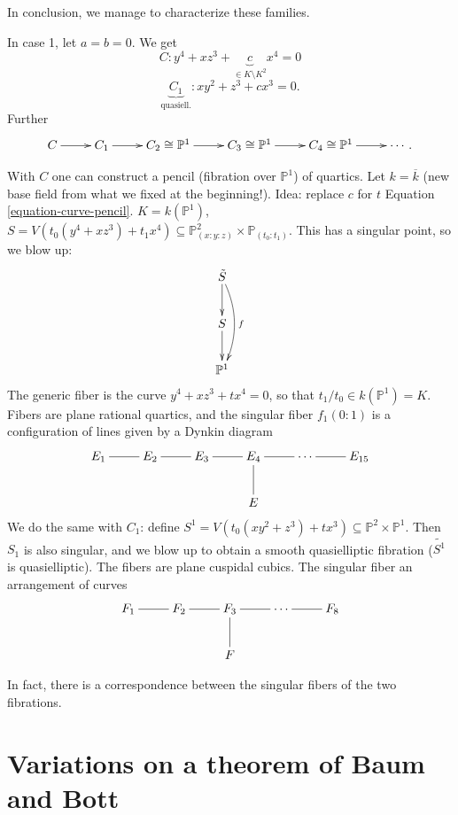 \noindent
In conclusion, we manage to characterize
these families.

\begin{example}
\label{example-chain-of-maps}
In case 1, let $a=b=0$. We get
\begin{equation}
\label{equation-curve-pencil}
C: y^4+xz^3+\underbrace{c}_{\in K\setminus
K^2}x^4=0
\end{equation}
$$
\underbrace{C_1}_{\text{quasiell.}}:xy^2+z^3+
cx^3=0.
$$
Further
$$
\xymatrix{
C\ar[r]&C_1\ar[r]&C_2 \cong\mathbb{P}^1\ar[r]
&C_3 \cong \mathbb{P}^1\ar[r]&C_4\cong
\mathbb{P}^1\ar[r]&\cdots.
}
$$
\end{example}

\medskip\noindent
With $C$ one can construct a pencil
(fibration over $\mathbb{P}^1$)
of quartics.
Let $k=\overline{k}$ (new base field from
what we fixed at the beginning!).
Idea: replace $c$ for $t$ Equation
\ref{equation-curve-pencil}.
 $K=k(\mathbb{P}^1)$,
 $S=V(t_0(y^4+xz^3)+t_1x^4)
\subseteq \mathbb{P}^2_{(x:y:z)}\times
\mathbb{P}_{(t_0:t_1)}$.
This has a singular point, so we blow up:
$$
\xymatrix{
\tilde{S}\ar[d]\ar@/^1em/[dd]^f\\
S\ar[d]\\\mathbb{P}^1
}
$$
The generic fiber is the curve
$y^4+xz^3+tx^4=0$,
so that $t_1/t_0 \in k(\mathbb{P}^1)=K$.
Fibers are plane rational quartics,
and the singular fiber $f_1(0:1)$ is a
configuration of lines
given by a Dynkin diagram
$$
\xymatrix{
E_1 \ar@{-}[r]& E_2\ar@{-}[r]
& E_3 \ar@{-}[r]& E_4\ar@{-}[d]\ar@{-}[r]
& \cdots \ar@{-}[r]& E_{15}\\
& & & E
}
$$
We do the same with $C_1$: define
$S^1=V(t_0(xy^2+z^3)+tx^3) \subseteq
\mathbb{P}^2 \times \mathbb{P}^1$.
Then $S_1$ is also singular, and we blow up
to obtain a smooth
quasielliptic fibration ($\tilde{S^1}$ is
quasielliptic).
The fibers are plane cuspidal cubics.
The singular fiber an arrangement of curves
$$
\xymatrix{
F_1 \ar@{-}[r]& F_2\ar@{-}[r]&
F_3\ar@{-}[d]\ar@{-}[r]& \cdots \ar@{-}[r]&
F_8\\
& & F
}
$$

In fact, there is a correspondence between
the
singular fibers of the two fibrations.

\section{Variations on a theorem of Baum and
Bott}
\label{section-baum-and-bott}

